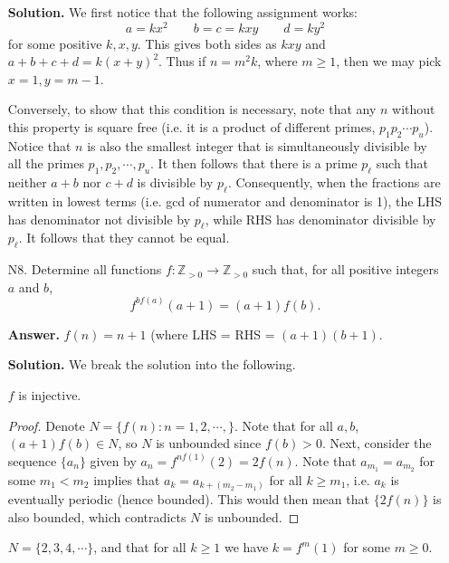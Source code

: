 \documentclass[11pt,a4paper]{article}
\begin{document}
\begin{enumerate}
    	\textbf{Solution.}
    	We first notice that the following assignment works: 
    	\[
    	a = kx^2\qquad b = c = kxy \qquad d = ky^2
    	\]
    	for some positive $k, x, y$. 
    	This gives both sides as $kxy$ and $a+b+c+d=k(x+y)^2$. 
    	Thus if $n = m^2k$, where $m\ge 1$, 
    	then we may pick $x=1, y=m - 1$. 
    	
    	Conversely, to show that this condition is necessary, 
    	note that any $n$ without this property is square free 
    	(i.e. it is a product of different primes, $p_1p_2\cdots p_u$). 
    	Notice that $n$ is also the smallest integer that is simultaneously divisible by all the primes $p_1, p_2, \cdots, p_u$. 
    	It then follows that there is a prime $p_{\ell}$ such that 
    	neither $a+b$ nor $c+d$ is divisible by $p_{\ell}$. 
    	Consequently, when the fractions are written in lowest terms (i.e. gcd of numerator and denominator is 1), 
    	the LHS has denominator not divisible by $p_{\ell}$, 
    	while RHS has denominator divisible by $p_{\ell}$. 
    	It follows that they cannot be equal. 
    	
    	\item [N8.]
    	Determine all functions $f\colon\mathbb{Z}_{>0}\to\mathbb{Z}_{>0}$ such that, for all positive integers $a$ and $b$,
    	\[
    	f^{bf(a)}(a+1)=(a+1)f(b).
    	\]
    	
    	\textbf{Answer.} 
    	$f(n) = n + 1$ (where LHS = RHS = $(a + 1)(b + 1)$. 
    	
    	\textbf{Solution. }
    	We break the solution into the following. 
    	\begin{lemma}
    		$f$ is injective. 
    	\end{lemma}
    	\begin{proof}
    		Denote $N = \{f(n): n = 1, 2, \cdots, \}$. 
    		Note that for all $a, b$, 
    		$(a + 1)f(b)\in N$, 
    		so $N$ is unbounded since $f(b) > 0$. 
    		Next, consider the sequence 
    		$\{a_n\}$ given by $a_n = f^{nf(1)}(2) = 2f(n)$. 
    		Note that $a_{m_1}=a_{m_2}$ for some $m_1<m_2$ implies that $a_{k} = a_{k + (m_2-m_1)}$ for all $k\ge m_1$, 
    		i.e. $a_k$ is eventually periodic (hence bounded). 
    		This would then mean that $\{2f(n)\}$ is also bounded, 
    		which contradicts $N$ is unbounded. 
    	\end{proof}
    	
    	\begin{lemma}
    		$N = \{2, 3, 4, \cdots\}$, 
    		and that for all $k\ge 1$ we have $k = f^m(1)$ for some $m\ge 0$. 
    	\end{lemma}
    	

\end{enumerate}
\end{document}
